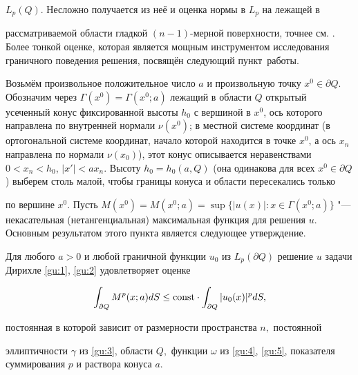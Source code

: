 $L_p(Q)$. Несложно получается из неё и оценка нормы в $L_p$ на лежащей в

рассматриваемой области гладкой $(n-1)$-мерной поверхности, точнее см. \cite{MSB12}. Более тонкой оценке, которая является мощным инструментом исследования граничного поведения решения, посвящён следующий пункт~работы.




\smallskip




Возьмём произвольное положительное число $a$ и произвольную точку $x^0 \in \partial Q$. Обозначим через $\Gamma (x^0) = \Gamma(x^0; a)$ лежащий в области $Q$ открытый усеченный конус фиксированной высоты $h_0$ с вершиной в $x^0$, ось которого направлена по внутренней нормали $\nu (x^0)$; в местной системе координат (в ортогональной системе координат, начало которой находится в точке $x^0$, а ось $x_n$ направлена по нормали $\nu (x_0)$), этот конус описывается неравенствами $0 < x_n < h_0$, $|x'| < a x_n$. Высоту $h_0 =  h_0(a, Q)$ (она одинакова для всех $x^0 \in \partial Q$) выберем столь малой, чтобы границы конуса и области пересекались только

по вершине $x^0$. Пусть $M(x^0) = M(x^0; a) = \sup\{ |u(x)|: x \in \Gamma(x^0;

a)\}$ "--- некасательная (нетангенциальная) максимальная функция для решения $u$. Основным результатом этого пункта является следующее утверждение.



\smallskip



\begin{theorem}Для любого $a > 0$ и любой граничной функции $u_0$ из $L_p(\partial Q)$ решение $u$ задачи Дирихле \eqref{gu:1}, \eqref{gu:2} удовлетворяет оценке

\begin{equation}

\int_{\partial Q} M^p(x; a) dS \leq {\mathop{\rm const}\nolimits } \cdot  \int_{\partial Q} |u_0(x)|^p dS, 

\label{gu:7}

\end{equation}

постоянная в которой зависит от размерности пространства $n,$ постоянной

эллиптичности $\gamma$ из \eqref{gu:3}{\rm ,}  области $Q,$ функции $\omega$ из \eqref{gu:4}{\rm ,} \eqref{gu:5}{\rm ,} показателя суммирования $p$ и раствора конуса $a.$

\end{theorem}



